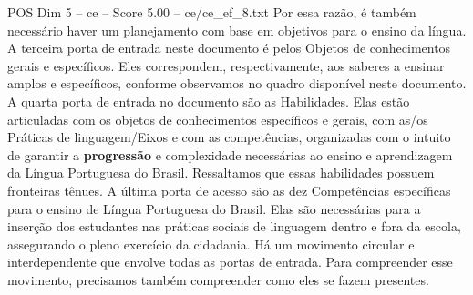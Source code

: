\begin{textsample}{POS Dim 5 – ce – Score 5.00 – ce/ce\_ef\_8.txt}
Por essa razão, é também necessário haver um planejamento com base em objetivos para o ensino da língua.
A terceira porta de entrada neste documento é pelos Objetos de conhecimentos gerais e específicos.
Eles correspondem, respectivamente, aos saberes a ensinar amplos e específicos, conforme observamos no quadro disponível neste documento.
A quarta porta de entrada no documento são as Habilidades.
Elas estão articuladas com os objetos de conhecimentos específicos e gerais, com as/os Práticas de linguagem/Eixos e com as competências, organizadas com o intuito de garantir a \textbf{progressão} e complexidade necessárias ao ensino e aprendizagem da Língua Portuguesa do Brasil.
Ressaltamos que essas habilidades possuem fronteiras tênues.
A última porta de acesso são as dez Competências específicas para o ensino de Língua Portuguesa do Brasil.
Elas são necessárias para a inserção dos estudantes nas práticas sociais de linguagem dentro e fora da escola, assegurando o pleno exercício da cidadania.
Há um movimento circular e interdependente que envolve todas as portas de entrada.
Para compreender esse movimento, precisamos também compreender como eles se fazem presentes.

\end{textsample}
